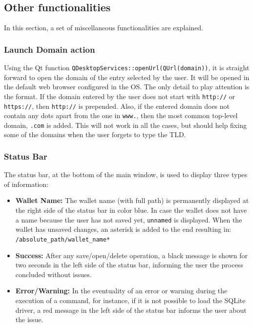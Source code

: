 \subsection{Other functionalities}
In this section, a set of miscellaneous functionalities are explained.

\subsubsection*{Launch Domain action}

Using the Qt function \texttt{QDesktopServices::openUrl(QUrl(domain))}, it is straight forward to open the domain of the entry selected by the user. It will be opened in the default web browser configured in the OS. The only detail to play attention is the format. If the domain entered by the user does not start with \texttt{http://} or \texttt{https://}, then \texttt{http://} is prepended. Also, if the entered domain does not contain any dots apart from the one in \texttt{www.}, then the most common top-level domain, \texttt{.com} is added. This will not work in all the cases, but should help fixing some of the domains when the user forgets to type the TLD.


\subsubsection*{Status Bar}
The status bar, at the bottom of the main window, is used to display three types of information:

\begin{itemize}
\setlength\itemsep{-3pt}

\item \textbf{Wallet Name: }The wallet name (with full path) is permanently displayed at the right side of the status bar in color blue. In case the wallet does not have a name because the user has not saved yet, \texttt{unnamed} is displayed. When the wallet has unsaved changes, an asterisk is added to the end resulting in: \texttt{/absolute\_path/wallet\_name*} 

\item \textbf{Success: }After any save/open/delete operation, a black message is shown for two seconds in the left side of the status bar, informing the user the process concluded without issues.

\item \textbf{Error/Warning: }In the eventuality of an error or warning during the execution of a command, for instance, if it is not possible to load the SQLite driver, a red message in the left side of the status bar informs the user about the issue.
\end{itemize}


